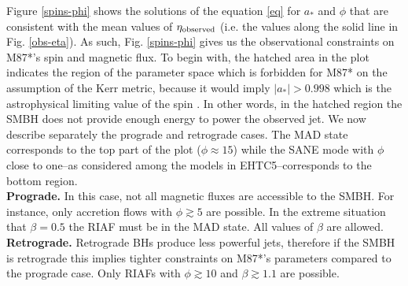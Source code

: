 \documentclass[twocolumn, linenumbers]{aastex62} %
\begin{document}
Figure \ref{spins-phi} shows the solutions of the equation \ref{eq} for $a_*$ and $\phi$ that are consistent with the mean values of $\eta_{\rm observed}$ (i.e. the values along the solid line in Fig. \ref{obs-eta}). %
As such, Fig. \ref{spins-phi} gives us the observational constraints on M87*'s spin and magnetic flux. To begin with, the hatched area in the plot indicates the region of the parameter space which is forbidden for M87* on the assumption of the Kerr metric, because it would imply $|a_*| > 0.998$ which is the astrophysical limiting value of the spin \citep{Thorne1974}. In other words, in the hatched region the SMBH does not provide enough energy to power the observed jet. We now describe separately the prograde and retrograde cases. The MAD state corresponds to the top part of the plot ($\phi \approx 15$) while the SANE mode with $\phi$ close to one--as considered among the models in EHTC5--corresponds to the bottom region. \\
%
\textbf{Prograde.} In this case, not all magnetic fluxes are accessible to the SMBH. For instance, only accretion flows with $\phi \gtrsim 5$ are possible. In the extreme situation that $\beta=0.5$  the RIAF must be in the MAD state. All values of $\beta$ are allowed. \\
\textbf{Retrograde.} Retrograde BHs produce less powerful jets, therefore if the SMBH is retrograde this implies tighter constraints on M87*'s parameters compared to the prograde case. Only RIAFs with  $\phi \gtrsim 10$ and $\beta \gtrsim 1.1$ are possible.  \\
\end{document}
